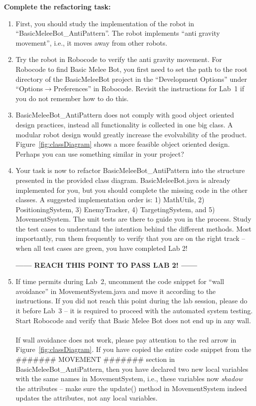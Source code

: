 \documentclass{scrreprt}
\begin{document}
\textbf{Complete the refactoring task:}
\begin{enumerate}
\item First, you should study the implementation of the robot in ``BasicMeleeBot_AntiPattern''. The robot implements ``anti gravity movement'', i.e., it moves away from other robots. 
\item Try the robot in Robocode to verify the anti gravity movement. For Robocode to find Basic Melee Bot, you first need to set the path to the root directory of the BasicMeleeBot project in the ``Development Options'' under ``Options$\rightarrow$Preferences'' in Robocode. Revisit the instructions for Lab~1 if you do not remember how to do this.
\item BasicMeleeBot_AntiPattern does not comply with good object oriented design practices, instead all functionality is collected in one big class. A modular robot design would greatly increase the evolvability of the product. Figure~\ref{fig:classDiagram} shows a more feasible object oriented design. Perhaps you can use something similar in your project?
\item Your task is now to refactor BasicMeleeBot_AntiPattern into the structure presented in the provided class diagram. BasicMeleeBot.java is already implemented for you, but you should complete the missing code in the other classes. A suggested implementation order is: 1) MathUtils, 2) PositioningSystem, 3) EnemyTracker, 4) TargetingSystem, and 5) MovementSystem. The unit tests are there to guide you in the process. Study the test cases to understand the intention behind the different methods. Most importantly, run them frequently to verify that you are on the right track -- when all test cases are green, you have completed Lab 2!
\begin{center}
\textbf{------ REACH THIS POINT TO PASS LAB 2! ------}
\end{center}
\item If time permits during Lab~2, uncomment the code snippet for ``wall avoidance'' in MovementSystem.java and move it according to the instructions. If you did not reach this point during the lab session, please do it before Lab~3 -- it is required to proceed with the automated system testing. Start Robocode and verify that Basic Melee Bot does not end up in any wall. \\\\If wall avoidance does not work, please pay attention to the red arrow in Figure~\ref{fig:classDiagram}. If you have copied the entire code snippet from the \#\#\#\#\#\#\# MOVEMENT \#\#\#\#\#\#\# section in BasicMeleeBot\_AntiPattern, then you have declared two new local variables with the same names in MovementSystem, i.e., these variables now \textit{shadow} the attributes -- make sure the update() method in MovementSystem indeed updates the attributes, not any local variables.
\end{enumerate}
\end{document}
